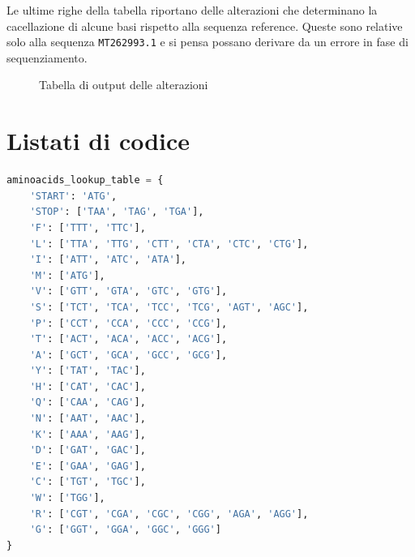\documentclass[11pt,italian]{article}
\begin{document}
Le ultime righe della tabella riportano delle alterazioni che determinano la cacellazione di alcune basi rispetto alla sequenza reference.
Queste sono relative solo alla sequenza \lstinline{MT262993.1} e si pensa possano derivare da un errore in fase di sequenziamento.

\begin{figure}
  \caption{Tabella di output delle alterazioni}
  \label{fig:alteration_table}
\end{figure}

\newpage
\section{Listati di codice}
\begin{lstlisting}[language=Python,caption=Tabella per la traduzione in amminoacidi,label=code:aminoacids_table]
aminoacids_lookup_table = {
    'START': 'ATG',
    'STOP': ['TAA', 'TAG', 'TGA'],
    'F': ['TTT', 'TTC'],
    'L': ['TTA', 'TTG', 'CTT', 'CTA', 'CTC', 'CTG'],
    'I': ['ATT', 'ATC', 'ATA'],
    'M': ['ATG'],
    'V': ['GTT', 'GTA', 'GTC', 'GTG'],
    'S': ['TCT', 'TCA', 'TCC', 'TCG', 'AGT', 'AGC'],
    'P': ['CCT', 'CCA', 'CCC', 'CCG'],
    'T': ['ACT', 'ACA', 'ACC', 'ACG'],
    'A': ['GCT', 'GCA', 'GCC', 'GCG'],
    'Y': ['TAT', 'TAC'],
    'H': ['CAT', 'CAC'],
    'Q': ['CAA', 'CAG'],
    'N': ['AAT', 'AAC'],
    'K': ['AAA', 'AAG'],
    'D': ['GAT', 'GAC'],
    'E': ['GAA', 'GAG'],
    'C': ['TGT', 'TGC'],
    'W': ['TGG'],
    'R': ['CGT', 'CGA', 'CGC', 'CGG', 'AGA', 'AGG'],
    'G': ['GGT', 'GGA', 'GGC', 'GGG']
}
\end{lstlisting}
\end{document}
